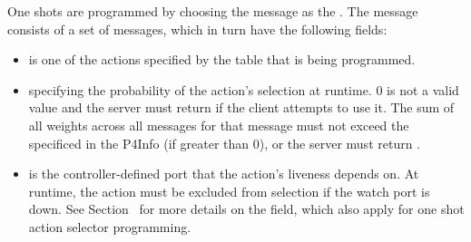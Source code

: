 \documentclass[11pt]{article}
\begin{document}
{%
One shots are programmed by choosing the  message as the
. The  message consists of a set of
 messages, which in turn have the following fields:%

\begin{itemize}%

\item{}
 is one of the actions specified by the table that is being
programmed.%

\item{}
 specifying the probability of the action's selection at runtime. 0 is
not a valid  value and the server must return  if
the client attempts to use it. The sum of all weights across all
 messages for that  message must
not exceed the  specificed in the P4Info (if greater than 0),
or the server must return .%

\item{}
 is the controller-defined port that the action's liveness depends
on. At runtime, the action must be excluded from selection if the watch port
is down. See Section~ for more details
on the  field, which also apply for one shot action selector
programming.%
\end{itemize}%

}
\end{document}
